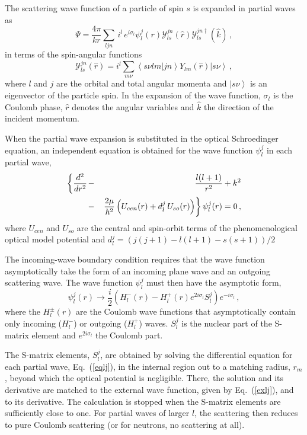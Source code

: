The scattering wave function of a particle of spin $s$ is expanded in
partial waves as
\begin{equation}
\Psi=%
\frac{4\pi}{kr}\sum_{ljn}\, i^{l}\, e^{i\sigma_{l}}\psi_{l}^{j}(r){\mathcal{Y%
}}_{ls}^{jn}(\hat{r}){\mathcal{Y}}_{ls}^{jn\dagger}(\hat{k})\,,
\label{parwav}
\end{equation}
in terms of the spin-angular functions
\begin{equation}
{\mathcal{Y}}_{ls}^{jn}(\hat{r})=i^{l}\sum_{m\nu}\left\langle s\nu
lm|jn\right\rangle Y_{lm}(\hat{r})\left|s\nu\right\rangle \,,
\end{equation}
where $l$ and $j$ are the orbital and total angular momenta and $%
\left|s\nu\right\rangle $ is an eigenvector of the particle spin. In the
expansion of the wave function, $\sigma_{l}$ is the Coulomb phase, $\hat{r}$
denotes the angular variables and $\hat{k}$ the direction of the incident
momentum.

When the partial wave expansion is substituted in the optical Schroedinger
equation, an independent equation is obtained for the wave function $%
\psi_{l}^{j}$ in each partial wave,
\begin{eqnarray}
\left\{ \frac{d^{2}}{dr^{2}}\right. & - & \frac{l(l+1)}{r^{2}}+k^{2}
\label{eqlj} \\
& - & \left.\frac{2\mu}{\hbar^{2}}\left(U_{cen}(r)+d_{l}^{j}\,
U_{so}(r)\right)\right\} \psi_{l}^{j}(r)=0\,,  \notag
\end{eqnarray}
where $U_{cen}$ and $U_{so}$ are the central and spin-orbit terms of the
phenomenological optical model potential and $%
d_{l}^{j}=(j(j+1)-l(l+1)-s(s+1))/2$

The incoming-wave boundary condition requires that the wave function
asymptotically take the form of an incoming plane wave and an outgoing
scattering wave. The wave function $\psi_{l}^{j}$ must then have the
asymptotic form,
\begin{equation}
\psi_{l}^{j}(r)\rightarrow\frac{i}{2}\left(H_{l}^{-}(r)-H_{l}^{+}(r)e^{2i%
\sigma_{l}}S_{l}^{j}\right)e^{-i\sigma_{l}}\,,  \label{exlj}
\end{equation}
where the $H_{l}^{\pm}(r)$ are the Coulomb wave functions that
asymptotically contain only incoming ($H_{l}^{-}$) or outgoing ($H_{l}^{+}$)
waves. $S_{l}^{j}$ is the nuclear part of the S-matrix element and $%
e^{2i\sigma_{l}}$ the Coulomb part.

The S-matrix elements, $S_{l}^{j}$, are obtained by solving the differential
equation for each partial wave, Eq.~(\ref{eqlj}), in the internal region out
to a matching radius, $r_{m}$, beyond which the optical potential is
negligible. There, the solution and its derivative are matched to the
external wave function, given by Eq.~(\ref{exlj}), and to its derivative.
The calculation is stopped when the S-matrix elements are sufficiently close
to one. For partial waves of larger $l$, the scattering then reduces to pure
Coulomb scattering (or for neutrons, no scattering at all).

